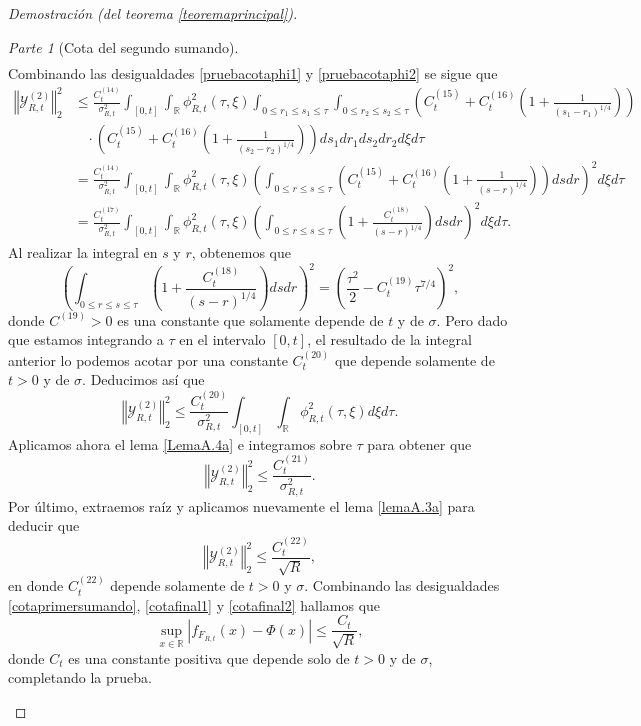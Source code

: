 \documentclass[letterpaper,twoside,12pt]{book}
\newcommand{\R}{\mathbb{R}}
\newcommand{\1}{\mathds{1}}
\newcommand{\abs}[1]{\left\lvert #1 \right\rvert}
\newcommand{\norm}[1]{\left\Vert #1 \right\Vert}
\theoremstyle{definition}
\theoremstyle{definition}
\theoremstyle{remark}
\newtheorem{proofpart}{Parte}
\theoremstyle{definition}
\theoremstyle{definition}
\theoremstyle{definition}
\theoremstyle{definition}
\theoremstyle{definition}
\begin{document}
\begin{proof}[Demostración (del teorema \ref{teoremaprincipal})]
\begin{proofpart}[Cota del segundo sumando]
\begin{align}
\end{align}
Combinando las desigualdades \eqref{pruebacotaphi1} y \eqref{pruebacotaphi2} se sigue que 
\begin{align*}
   \norm{\mathcal{Y}_{R,t}^{(2)}}_2^2&\leq  \frac{C_t^{(14)}}{\sigma_{R,t}^2}\int_{[0,t]}\int_\R\phi_{R,t}^2(\tau,\xi)\int_{0\leq r_1\leq s_1\leq \tau}\int_{0\leq r_2\leq s_2\leq \tau}\left(C_t^{(15)}+C_t^{(16)}\left(1+\frac{1}{(s_1-r_1)^{1/4}}\right)\right)\\
   &\ \ \ \ \cdot\left(C_t^{(15)}+C_t^{(16)}\left(1+\frac{1}{(s_2-r_2)^{1/4}}\right)\right)ds_1dr_1ds_2dr_2d\xi d\tau\\
   &=\frac{C_t^{(14)}}{\sigma_{R,t}^2}\int_{[0,t]}\int_\R\phi_{R,t}^2(\tau,\xi)\left(\int_{0\leq r\leq s\leq \tau}\left(C_t^{(15)}+C_t^{(16)}\left(1+\frac{1}{(s-r)^{1/4}}\right)\right)ds dr\right)^2d\xi d\tau\\
   &=\frac{C_t^{(17)}}{\sigma_{R,t}^2}\int_{[0,t]}\int_\R\phi_{R,t}^2(\tau,\xi)\left(\int_{0\leq r\leq s\leq \tau}\left(1+\frac{C_t^{(18)}}{(s-r)^{1/4}}\right)ds dr\right)^2d\xi d\tau.
\end{align*}
Al realizar la integral en $s$ y $r$, obtenemos que 
\[
   \left(\int_{0\leq r\leq s\leq \tau}\left(1+\frac{C_t^{(18)}}{(s-r)^{1/4}}\right)ds dr\right)^2=\left(\frac{\tau^2}{2}-C^{(19)}_t\tau^{7/4}\right)^2,
\]
donde $C^{(19)}>0$ es una constante que solamente depende de $t$ y de $\sigma$. Pero dado que estamos integrando a $\tau$ en el intervalo $[0,t]$, el resultado de la integral anterior lo podemos acotar por una constante $C_t^{(20)}$ que depende solamente de $t>0$ y de $\sigma$. Deducimos así que
\[
   \norm{\mathcal{Y}_{R,t}^{(2)}}_2^2\leq \frac{C^{(20)}_t}{\sigma_{R,t}^2}\int_{[0,t]}\int_\R\phi_{R,t}^2(\tau,\xi)d\xi d\tau.
\]
Aplicamos ahora el lema \ref{LemaA.4a} e integramos sobre $\tau$ para obtener que 
\[
   \norm{\mathcal{Y}_{R,t}^{(2)}}_2^2\leq \frac{C^{(21)}_t}{\sigma_{R,t}^2}.
\] 
Por último, extraemos raíz y aplicamos nuevamente el lema \ref{lemaA.3a} para deducir que  
\begin{equation}\label{cotafinal2}
   \norm{\mathcal{Y}_{R,t}^{(2)}}_2^2\leq \frac{C^{(22)}_t}{\sqrt{R}},
\end{equation}
en donde $C_t^{(22)}$ depende solamente de $t>0$ y $\sigma$. Combinando las desigualdades \eqref{cotaprimersumando}, \eqref{cotafinal1} y \eqref{cotafinal2} hallamos que 
\[
   \sup_{x\in \R} \abs{f_{F_{R,t}}(x)-\Phi(x)}\leq \frac{C_t}{\sqrt{R}},
\]
donde $C_t$ es una constante positiva que depende solo de $t>0$ y de $\sigma$, completando la prueba.
\end{proofpart}
\qedhere
\end{proof}
\end{document}
